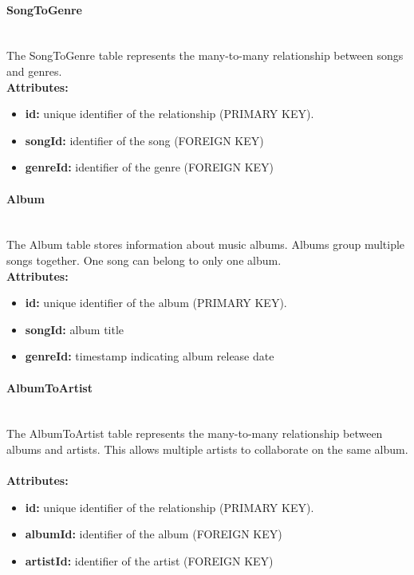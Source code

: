 \documentclass[11pt, a4paper]{article}
\begin{document}
\paragraph{SongToGenre}~\\
The SongToGenre table represents the many-to-many relationship between songs and genres.
~\\\textbf{Attributes:}
\begin{itemize}
    \item \textbf{id:} unique identifier of the relationship (PRIMARY KEY).
    \item \textbf{songId:} identifier of the song (FOREIGN KEY)
    \item \textbf{genreId:} identifier of the genre (FOREIGN KEY)
\end{itemize}

\paragraph{Album}~\\
The Album table stores information about music albums. Albums group multiple songs together. One song can belong to only one album.
~\\\textbf{Attributes:}
\begin{itemize}
    \item \textbf{id:} unique identifier of the album (PRIMARY KEY).
    \item \textbf{songId:} album title
    \item \textbf{genreId:} timestamp indicating album release date
\end{itemize}

\paragraph{AlbumToArtist}~\\
The AlbumToArtist table represents the many-to-many relationship between albums and artists. This allows multiple artists to collaborate on the same album.
~\\\textbf{Attributes:}
\begin{itemize}
    \item \textbf{id:} unique identifier of the relationship (PRIMARY KEY).
    \item \textbf{albumId:} identifier of the album (FOREIGN KEY)
    \item \textbf{artistId:} identifier of the artist (FOREIGN KEY)
\end{itemize}
\end{document}
